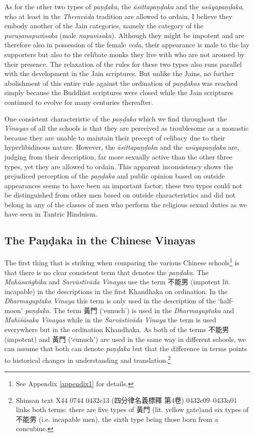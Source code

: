 As for the other two types of {\em paṇḍaka}, the {\em āsittapaṇḍaka} and the {\em usūyapaṇḍaka}, who at least in the {\em Theravāda} tradition are allowed to ordain, I believe they embody another of the Jain categories, namely the category of the {\em puruṣanapuṁsaka} (male {\em napuṁsaka}). Although they might be impotent and are therefore also in possession of the female {\em veda}, their appearance is male to the lay supporters but also to the celibate monks they live with who are not aroused by their presence. The relaxation of the rules for these two types also runs parallel with the development in the Jain scriptures. But unlike the Jains, no further abolishment of this entire rule against the ordination of {\em paṇḍakas} was reached simply because the Buddhist scriptures were closed while the Jain scriptures continued to evolve for many centuries thereafter.

One consistent characteristic of the {\em paṇḍaka} which we find throughout the {\em Vinayas} of all the schools is that they are perceived as troublesome as a monastic because they are unable to maintain their precept of celibacy due to their hyperlibidinous nature. However, the {\em āsittapaṇḍaka} and the {\em usūyapaṇḍaka} are, judging from their description, far more sexually active than the other three types, yet they are allowed to ordain. This apparent inconsistency shows the prejudiced perception of the {\em paṇḍaka} and public opinion based on outside appearances seems to have been an important factor; these two types could not be distinguished from other men based on outside characteristics and did not belong in any of the classes of men who perform the religious sexual duties as we have seen in Tantric Hinduism.

\subsection{The Paṇḍaka in the Chinese Vinayas}
\label{pandakainchinese}
The first thing that is striking when comparing the various Chinese schools\footnote{See Appendix \ref{appendix1} for details.} is that there is no clear consistent term that denotes the {\em paṇḍaka}. The {\em Mahāsaṅghika} and {\em Sarvāstivāda} {\em Vinayas} use the term 不能男 (impotent lit. incapable) in the descriptions in the first Khandhaka on ordination. In the {\em Dharmaguptaka} {\em Vinaya} this term is only used in the description of the `half-moon' {\em paṇḍaka}. The term 黃門 (`eunuch') is used in the {\em Dharmaguptaka} and {\em Mahīśāsaka} {\em Vinayas} while in the {\em Sarvāstivāda} {\em Vinaya} the term is used everywhere but in the ordination Khandhaka. As both of the terms 不能男 (impotent) and 黃門 (`eunuch') are used in the same way in different schools, we can assume that both can denote {\em paṇḍaka} but that the difference in terms points to historical changes in understanding and translation.\footnote{Shinsan text X44 0744 0432c13 (四分律名義標釋 第4卷) 0432c09–0433a01 links both terms: there are five types of 黃門 (lit. yellow gate)and six types of 不能男 (i.e. incapable men), the sixth type being those born from a concubine.}

